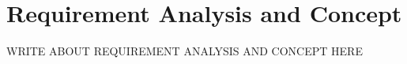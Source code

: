 \chapter{Requirement Analysis and Concept}
\label{ch:chapter04}
WRITE ABOUT REQUIREMENT ANALYSIS AND CONCEPT HERE
